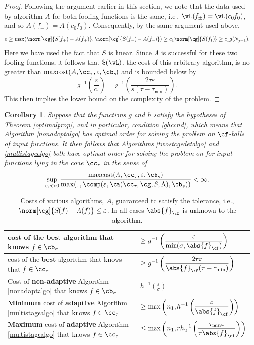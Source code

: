\documentclass[]{elsarticle}
\DeclareMathOperator{\maxcost}{maxcost}
\newtheorem{cor}{Corollary}
\theoremstyle{definition}
\theoremstyle{remark}
\newcommand{\Fnorm}[1]{\abs{#1}_{\cf}}
\begin{document}
\begin{proof}
Following the argument earlier in this section, we note that the data used by algorithm $A$ for both fooling functions is the same, i.e., $\vL(f_{\pm})=\vL(c_0f_0)$, and so $A(f_{\pm})=A(c_0f_0)$.  Consequently, by the same argument used above, 
\[
\varepsilon  \ge  \max(\norm[\cg]{S(f_+)-A(f_+)},\norm[\cg]{S(f_-)-A(f_-)}) \ge c_1 \norm[\cg]{S(f_1)}\ge c_1 g(N_{j+1}).
\]
Here we have used the fact that $S$ is linear.  Since $A$ is successful for these two fooling functions, it follows that $\$(\vL)$, the cost of this arbitrary algorithm, is no greater than $\maxcost(A,\cc_{\tau},\varepsilon,\cb_s)$ and is bounded below by
\[
g^{-1} \left ( \frac{\varepsilon}{c_1} \right ) = g^{-1}\left(\frac{2 \tau \varepsilon}{s(\tau-\tau_{\min})}\right).
\]
This then implies the lower bound on the complexity of the problem.   
\end{proof}

\begin{cor} \label{optimcor}
Suppose that the functions $g$ and $h$ satisfy the hypotheses of Theorem \ref{optimalprop}, and in particular, condition \eqref{ghcond}, which means that Algorithm \ref{nonadaptalgo} has optimal order for solving the problem on $\cf$-balls of input functions.  It then follows that Algorithms \ref{twostagedetalgo} and \ref{multistagealgo} both have optimal order for solving the problem on for input functions lying in the cone $\cc_{\tau}$ in the sense of
\begin{equation*} \label{nearoptdef}
\sup_{\varepsilon,s > 0} \frac{\maxcost(A,\cc_\tau,\varepsilon,\cb_s)} {\max(1,\comp(\varepsilon,\ca(\cc_\tau,\cg,S,\Lambda),\cb_s))} <\infty.
\end{equation*} 
\end{cor}

\begin{table}
\centering
\begin{tabular}{>{\centering}m{6cm}>{\centering}m{5cm}}
\toprule
{\bf Minimum} cost of the {\bf best} algorithm that knows $f \in \cb_{\sigma}$ & $\displaystyle \ge g^{-1}\left(\frac{ \varepsilon}{\min(\sigma,\Fnorm{f})}\right)$ \tabularnewline
\midrule
{\bf Minimum} cost of the {\bf best} algorithm that knows that $f \in \cc_{\tau}$ & $\displaystyle \ge g^{-1}\left(\frac{2 \tau \varepsilon}{\Fnorm{f}(\tau-\tau_{\min})}\right)$ \tabularnewline
\midrule
Cost of {\bf non-adaptive} Algorithm \ref{nonadaptalgo} that knows $f \in \cb_{\sigma}$ & $\displaystyle h^{-1}\left(\frac{\varepsilon}{\sigma}\right)$ \tabularnewline
\midrule
{\bf Minimum} cost of {\bf adaptive} Algorithm \ref{multistagealgo} that knows $f \in \cc_{\tau}$ & $\displaystyle \ge \max\left( n_1, h^{-1}\left(\frac{\varepsilon}{\Fnorm{f}}\right)\right)$ \tabularnewline
\midrule
{\bf Maximum} cost of {\bf adaptive} Algorithm \ref{multistagealgo} that knows $f \in \cc_{\tau}$ & $\displaystyle \le \max \left(n_1, rh_2^{-1}\left(\frac{\tau_{\min}\varepsilon}{\tau \Fnorm{f}} \right) \right)$ \tabularnewline
\bottomrule
\end{tabular}
\caption{Costs of various algorithms, $A$, guaranteed to satisfy the tolerance, i.e.,  $\norm[\cg]{S(f) - A(f)} \le \varepsilon$. In all cases $\Fnorm{f}$ is unknown to the algorithm. \label{costcomparefig}}
\end{table}
\end{document}
